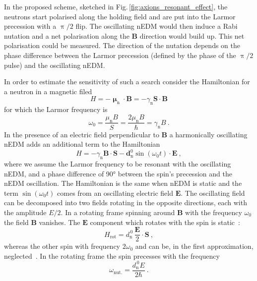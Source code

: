 In the proposed scheme, sketched in Fig.\,\ref{fig:axions_resonant_effect}, the neutrons start polarised along the holding field and are put into the Larmor precession with a $\uppi/2$ flip. The oscillating nEDM would then induce a Rabi nutation and a net polarisation along the $\mathbf{B}$ direction would build up. This net polarisation could be measured. The direction of the nutation depends on the phase difference between the Larmor precession (defined by the phase of the $\uppi/2$ pulse) and the oscillating nEDM\@.

In order to estimate the sensitivity of such a search consider the Hamiltonian for a neutron in a magnetic filed
\begin{equation}
  H = - \boldsymbol{\upmu}_\text{n} \cdot \mathbf{B} = - \gamma_\text{n} \mathbf{S} \cdot \mathbf{B}
\end{equation}
for which the Larmor frequency is
\begin{equation}
  \omega_0 = \frac{\mu_\text{n} B}{S} = \frac{2 \mu_\text{n} B}{\hbar} = \gamma_\text{n} B \ .
\end{equation}
In the presence of an electric field perpendicular to $\mathbf{B}$ a harmonically oscillating nEDM adds an additional term to the Hamiltonian
\begin{equation}
  H = - \gamma_\text{n} \mathbf{B} \cdot \mathbf{S} - \mathbf{d}_\text{n}^0 \sin (\omega_0 t) \cdot \mathbf{E} \ ,
\end{equation}
where we assume the Larmor frequency to be resonant with the oscillating nEDM, and a phase difference of \ang{90} between the spin's precession and the nEDM oscillation.
The Hamiltonian is the same when nEDM is static and the term $\sin (\omega_0 t)$ comes from an oscillating electric field $\mathbf{E}$. The oscillating field can be decomposed into two fields rotating in the opposite directions, each with the amplitude $E/2$. In a rotating frame spinning around $\mathbf{B}$ with the frequency $\omega_0$ the field $\mathbf{B}$ vanishes. The $\mathbf{E}$ component which rotates with the spin is static~\cite{RamseyBook}:
\begin{equation}
  H_\text{rot} = d_\text{n}^{\,0} \, \frac{\mathbf{E}}{2} \cdot \mathbf{S} \ ,
\end{equation}
whereas the other spin with frequency $2 \omega_0$ and can be, in the first approximation, neglected~\cite{RamseyBook}.
In the rotating frame the spin precesses with the frequency
\begin{equation}
  \omega_\text{nut.} = \frac{d_\text{n}^{\,0} E }{2 \hbar} \ .
\end{equation}
